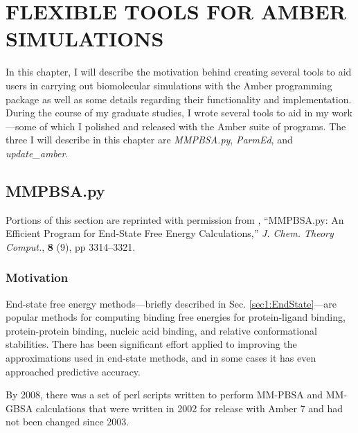 \chapter{FLEXIBLE TOOLS FOR AMBER SIMULATIONS}
\label{ch6}

In this chapter, I will describe the motivation behind creating several tools
to aid users in carrying out biomolecular simulations with the Amber programming
package as well as some details regarding their functionality and
implementation. During the course of my graduate studies, I wrote several tools
to aid in my work---some of which I polished and released with the Amber suite
of programs. The three I will describe in this chapter are \emph{MMPBSA.py},
\cite{MMPBSApy} \emph{ParmEd}, and \emph{update\_amber}.

\section{MMPBSA.py}

Portions of this section are reprinted with permission from
\citeauthor{MMPBSApy}, ``MMPBSA.py: An Efficient Program for End-State Free
Energy Calculations,'' \emph{J. Chem. Theory Comput.}, \textbf{8} (9), pp
3314--3321. \cite{MMPBSApy}

\subsection{Motivation}

End-state free energy methods---briefly described in Sec.
\ref{sec1:EndState}---are popular methods for computing binding free energies
for protein-ligand binding, \cite{Wang2001, Kuhn2005, Weis2006, Genheden2009,
Wang2001a} protein-protein binding, \cite{Gohlke2003, Gohlke2004, Bradshaw2010,
Wang2001a} nucleic acid binding, \cite{Gouda2002, Wang2001a} and relative
conformational stabilities. \cite{Combelles2008, Brice2011} There has been
significant effort applied to improving the approximations used in end-state
methods, and in some cases it has even approached predictive accuracy.
\cite{Genheden2009, Mikulskis2012}

By 2008, there was a set of perl scripts written to perform MM-PBSA and MM-GBSA
calculations that were written in 2002 for release with Amber 7 and had not been
changed since 2003.
